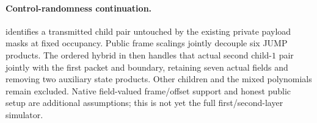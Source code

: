 \documentclass[11pt]{article}
\begin{document}
\paragraph{Control-randomness continuation.}  identifies a transmitted child pair untouched by the existing private payload masks at fixed occupancy. Public frame scalings jointly decouple six JUMP products. The ordered hybrid in  then handles that actual second child-$1$ pair jointly with the first packet and boundary, retaining seven actual fields and removing two auxiliary state products. Other children and the mixed polynomials remain excluded. Native field-valued frame/offset support and honest public setup are additional assumptions; this is not yet the full first/second-layer simulator.
\end{document}
